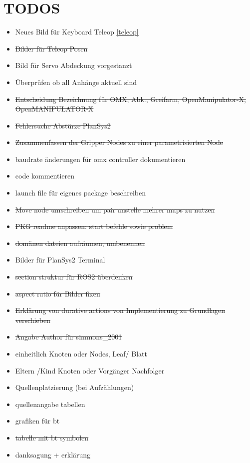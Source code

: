 \section{TODOS}
\begin{itemize}
    \item Neues Bild für Keyboard Teleop \ref{teleop}
    \item \sout{Bilder für Teleop Posen}
    \item Bild für Servo Abdeckung vorgestanzt
    \item Überprüfen ob all Anhänge aktuell sind
    \item \sout{Entscheidung Bezeichnung für OMX, Abk., Greifarm, OpenManipulator-X, OpenMANIPULATOR-X}
    \item \sout{Fehlersuche Abstürze PlanSys2}
    \item \sout{Zusammenfassen der Gripper Nodes zu einer parametrisierten Node}
    \item baudrate änderungen für omx controller dokumentieren
    \item code kommentieren
    \item launch file für eigenes package beschreiben
    \item \sout{Move node umschreiben um pair anstelle mehrer maps zu nutzen}
    \item \sout{PKG readme anpassen: start befehle sowie problem}
    \item \sout{domänen dateien aufräumen, umbenennen}
    \item Bilder für PlanSys2 Terminal
    \item \sout{section struktur für ROS2 überdenken}
    \item \sout{aspect ratio für Bilder fixen}
    \item \sout{Erklärung von durative actions von Implementierung zu Grundlagen verschieben}
    \item \sout{Angabe Author für simmons\_2001}
    \item einheitlich Knoten oder Nodes, Leaf/ Blatt
    \item Eltern /Kind Knoten oder Vorgänger Nachfolger
    \item Quellenplatzierung (bei Aufzählungen)
    \item quellenangabe tabellen
    \item grafiken für bt
    \item \sout{tabelle mit bt symbolen}
    \item danksagung + erklärung
\end{itemize}